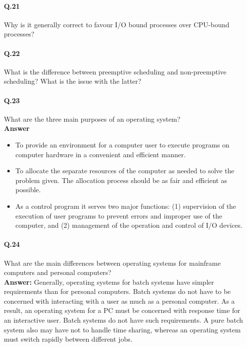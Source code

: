 \documentclass[a4paper,10pt]{article}
\begin{document}
\paragraph{Q.21}
Why is it generally correct to favour I/O bound processes over CPU-bound
processes?

\paragraph{Q.22}
What is the difference between preemptive scheduling and non-preemptive
scheduling? What is the issue with the latter?

\paragraph{Q.23}
What are the three main purposes of an operating system?
\\
\textbf{Answer}\\
\begin{itemize}
   \item To provide an environment for a computer user to execute programs
on computer hardware in a convenient and efficient manner.
 \item To allocate the separate resources of the computer as needed to
solve the problem given. The allocation process should be as fair
and efficient as possible.
 \item As a control program it serves two major functions: (1) supervision
of the execution of user programs to prevent errors and improper
use of the computer, and (2) management of the operation and
control of I/O devices.
 
\end{itemize}

\paragraph{Q.24}
What are the main differences between operating systems for mainframe
computers and personal computers?\\
\textbf{Answer:} Generally, operating systems for batch systems have simpler
requirements than for personal computers. Batch systems do not have
to be concerned with interacting with a user as much as a personal
computer. As a result, an operating system for a PC must be concerned
with response time for an interactive user. Batch systems do not have
such requirements. A pure batch system also may have not to handle
time sharing, whereas an operating system must switch rapidly between
different jobs.
\end{document}
